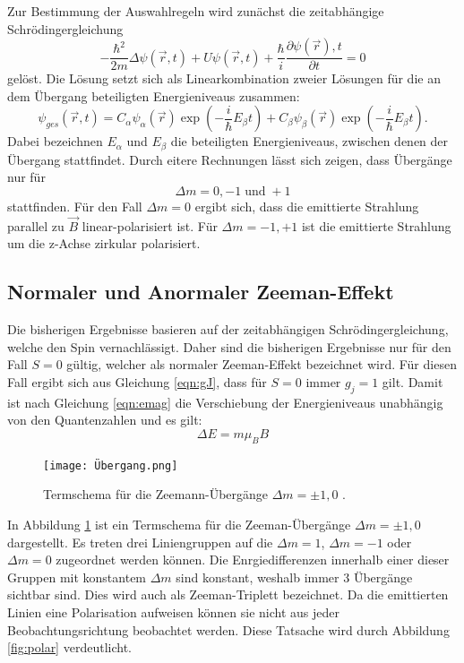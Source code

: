 Zur Bestimmung der Auswahlregeln wird zunächst die zeitabhängige
Schrödingergleichung
\begin{equation}
  -\frac{\hbar^2}{2m}\Delta\psi(\vec{r},t)+U\psi(\vec{r},t)+\frac{\hbar}{i}\frac{\partial\psi(\vec{r}),t}{\partial t}=0
\end{equation}
gelöst. Die Lösung setzt sich als Linearkombination zweier Lösungen für
die an dem Übergang beteiligten Energieniveaus zusammen:
\begin{equation}
  \psi_{ges}(\vec{r},t)=C_{\alpha}\psi_{\alpha}(\vec{r})\exp(-\frac{i}{\hbar}E_{\beta}t)+
  C_{\beta}\psi_{\beta}(\vec{r})\exp(-\frac{i}{\hbar}E_{\beta}t).
\end{equation}
Dabei bezeichnen $E_{\alpha}$ und $E_{\beta}$ die beteiligten Energieniveaus, zwischen denen
der Übergang stattfindet. Durch eitere Rechnungen lässt sich zeigen, dass Übergänge
nur für
\begin{equation}
  \Delta m= 0,-1 \;\text{und}\;+1
\end{equation}
stattfinden. Für den Fall $\Delta m=0$ ergibt sich, dass die emittierte
Strahlung  parallel zu $\vec{B}$ linear-polarisiert ist. Für $\Delta m= -1, +1$
ist die emittierte Strahlung um die z-Achse zirkular polarisiert.

\subsection{Normaler und Anormaler Zeeman-Effekt}
Die bisherigen Ergebnisse basieren auf der zeitabhängigen Schrödingergleichung,
welche den Spin vernachlässigt. Daher sind die bisherigen Ergebnisse nur für den
Fall $S=0$ gültig, welcher als normaler Zeeman-Effekt bezeichnet wird.
Für diesen Fall ergibt sich aus Gleichung \ref{eqn:gJ}, dass für $S=0$ immer
$g_j=1$ gilt. Damit ist nach Gleichung \ref{eqn:emag} die Verschiebung der
Energieniveaus unabhängig von den Quantenzahlen und es gilt:
\begin{equation}
  \Delta E =m \mu_B B
\end{equation}

\begin{figure}
  \centering
  \texttt{[image: Übergang.png]}
  \caption{Termschema für die Zeemann-Übergänge $\Delta m=\pm1, 0$ \cite{demtröder}. }
  \label{fig:Übergang}
\end{figure}


In Abbildung \ref{fig:Übergang} ist ein Termschema für die Zeeman-Übergänge
$\Delta m=\pm1, 0$ dargestellt. Es treten drei Liniengruppen auf die $\Delta m=1$,
$\Delta m=-1$ oder $\Delta m=0$ zugeordnet werden können. Die Enrgiedifferenzen
innerhalb einer dieser Gruppen mit konstantem $\Delta m $ sind konstant, weshalb
immer 3 Übergänge sichtbar sind. Dies wird auch als Zeeman-Triplett bezeichnet.
Da die emittierten Linien eine Polarisation aufweisen können sie nicht
aus jeder Beobachtungsrichtung beobachtet werden. Diese Tatsache wird durch Abbildung
\ref{fig:polar} verdeutlicht.

